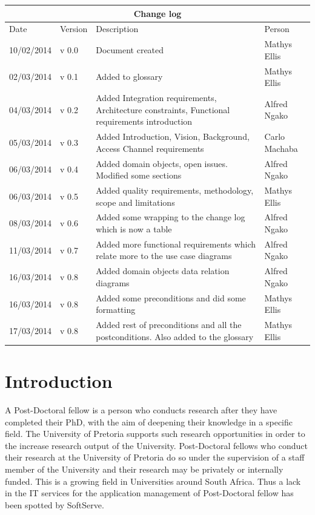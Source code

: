 \documentclass[12pt]{article}
\begin{document}
\begin{center}
\begin{tabular}{|l|p{1.4cm}|p{8cm}|p{2.8cm}|}
\hline
\multicolumn{4}{|c|}{\bf Change log} \\
\hline
 Date & Version & Description &  Person \\
\hline
10/02/2014 & v 0.0 & Document created & Mathys Ellis \\
\hline
02/03/2014 & v 0.1 & Added to glossary & Mathys Ellis \\
\hline
04/03/2014 & v 0.2 & Added Integration requirements, Architecture constraints, Functional requirements introduction & Alfred Ngako \\
\hline
05/03/2014 & v 0.3 & Added Introduction, Vision, Background, Access Channel requirements & Carlo Machaba \\
\hline
06/03/2014 & v 0.4 & Added domain objects, open issues. Modified some sections & Alfred Ngako \\
\hline
06/03/2014 & v 0.5 & Added quality requirements, methodology, scope and limitations & Mathys Ellis \\
\hline
08/03/2014 & v 0.6 & Added some wrapping to the change log which is now a table & Alfred Ngako \\
\hline
11/03/2014 & v 0.7 & Added more functional requirements which relate more to the use case diagrams & Alfred Ngako \\
\hline
16/03/2014 & v 0.8 & Added domain objects data relation diagrams & Alfred Ngako \\
\hline
16/03/2014 & v 0.8 & Added some preconditions and did some formatting & Mathys Ellis \\
\hline
17/03/2014 & v 0.8 & Added rest of preconditions and all the postconditions. Also added to the glossary & Mathys Ellis \\
\hline
\end{tabular}
\end{center}
\newpage
\tableofcontents

\listoffigures
\newpage
\section{Introduction} %
A Post-Doctoral fellow is a person who conducts research after they have completed their PhD, with the aim of deepening their knowledge in a specific field. The University of Pretoria supports such research opportunities in order to the increase research output of the University. Post-Doctoral fellows who conduct their research at the University of Pretoria do so under the supervision of a staff member of the University and their research may be privately or internally funded. This is a growing field in Universities around South Africa. Thus a lack in the IT services for the application management of Post-Doctoral fellow has been spotted by SoftServe.
\vspace{0.2in}
\end{document}

